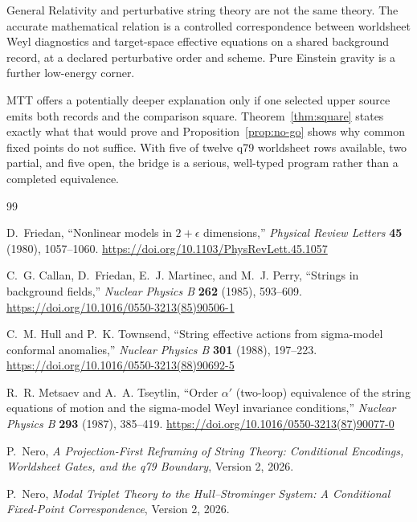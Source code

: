 \documentclass[11pt]{article}
\newcommand{\alphap}{\alpha'}
\begin{document}
General Relativity and perturbative string theory are not the same theory.
The accurate mathematical relation is a controlled correspondence between
worldsheet Weyl diagnostics and target-space effective equations on a shared
background record, at a declared perturbative order and scheme.  Pure
Einstein gravity is a further low-energy corner.

MTT offers a potentially deeper explanation only if one selected upper source
emits both records and the comparison square.  Theorem~\ref{thm:square}
states exactly what that would prove and Proposition~\ref{prop:no-go} shows
why common fixed points do not suffice.  With five of twelve q79 worldsheet
rows available, two partial, and five open, the bridge is a serious,
well-typed program rather than a completed equivalence.

\begin{thebibliography}{99}

D.~Friedan,
``Nonlinear models in \(2+\epsilon\) dimensions,''
\emph{Physical Review Letters} \textbf{45} (1980), 1057--1060.
\url{https://doi.org/10.1103/PhysRevLett.45.1057}

C.~G. Callan, D.~Friedan, E.~J. Martinec, and M.~J. Perry,
``Strings in background fields,''
\emph{Nuclear Physics B} \textbf{262} (1985), 593--609.
\url{https://doi.org/10.1016/0550-3213(85)90506-1}

C.~M. Hull and P.~K. Townsend,
``String effective actions from sigma-model conformal anomalies,''
\emph{Nuclear Physics B} \textbf{301} (1988), 197--223.
\url{https://doi.org/10.1016/0550-3213(88)90692-5}

R.~R. Metsaev and A.~A. Tseytlin,
``Order \(\alphap\) (two-loop) equivalence of the string equations of
motion and the sigma-model Weyl invariance conditions,''
\emph{Nuclear Physics B} \textbf{293} (1987), 385--419.
\url{https://doi.org/10.1016/0550-3213(87)90077-0}

P.~Nero,
\emph{A Projection-First Reframing of String Theory: Conditional
Encodings, Worldsheet Gates, and the q79 Boundary},
Version 2, 2026.

P.~Nero,
\emph{Modal Triplet Theory to the Hull--Strominger System: A Conditional
Fixed-Point Correspondence},
Version 2, 2026.

\end{thebibliography}
\end{document}
